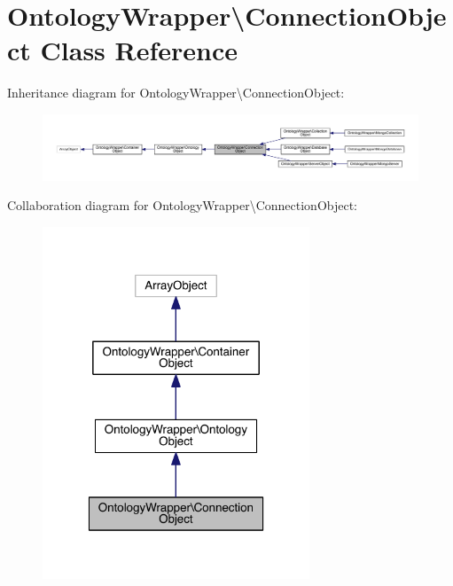 \hypertarget{class_ontology_wrapper_1_1_connection_object}{\section{Ontology\-Wrapper\textbackslash{}Connection\-Object Class Reference}
\label{class_ontology_wrapper_1_1_connection_object}
}


Inheritance diagram for Ontology\-Wrapper\textbackslash{}Connection\-Object\-:\nopagebreak
\begin{figure}[H]
\begin{center}
\leavevmode
\includegraphics[width=350pt]{class_ontology_wrapper_1_1_connection_object__inherit__graph}
\end{center}
\end{figure}


Collaboration diagram for Ontology\-Wrapper\textbackslash{}Connection\-Object\-:\nopagebreak
\begin{figure}[H]
\begin{center}
\leavevmode
\includegraphics[width=226pt]{class_ontology_wrapper_1_1_connection_object__coll__graph}
\end{center}
\end{figure}
